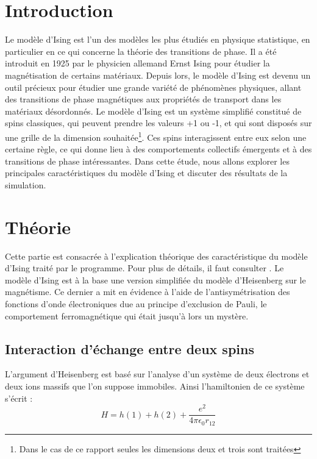 \documentclass{article}
\begin{document}
\newpage


\section{Introduction}

Le modèle d'Ising est l'un des modèles les plus étudiés en physique statistique, en particulier en ce qui concerne la théorie des transitions de phase. Il a été introduit en 1925 par le physicien allemand Ernst Ising pour étudier la magnétisation de certains matériaux. Depuis lors, le modèle d'Ising est devenu un outil précieux pour étudier une grande variété de phénomènes physiques, allant des transitions de phase magnétiques aux propriétés de transport dans les matériaux désordonnés. Le modèle d'Ising est un système simplifié constitué de spins classiques, qui peuvent prendre les valeurs +1 ou -1, et qui sont disposés sur une grille de la dimension souhaitée\footnote{Dans le cas de ce rapport seules les dimensions deux et trois sont traitées}. Ces spins interagissent entre eux selon une certaine règle, ce qui donne lieu à des comportements collectifs émergents et à des transitions de phase intéressantes. Dans cette étude, nous allons explorer les principales caractéristiques du modèle d'Ising et discuter des résultats de la simulation. 

\section{Théorie}

Cette partie est consacrée à l'explication théorique des caractéristique du modèle d'Ising traité par le programme. Pour plus de détails, il faut consulter \cite{Phystat}. Le modèle d'Ising est à la base une version simplifiée du modèle d'Heisenberg sur le magnétisme. Ce dernier a mit en évidence à l'aide de l'antisymétrisation des fonctions d'onde électroniques due au principe d'exclusion de Pauli, le comportement ferromagnétique qui était jusqu'à lors un mystère. 


\subsection{Interaction d'échange entre deux spins}

L'argument d'Heisenberg est basé sur l'analyse d'un système de deux électrons et deux ions massifs que l'on suppose immobiles. Ainsi l'hamiltonien de ce système s'écrit : 
\begin{equation}
    H= h(1) + h(2) + \frac{e^2}{4\pi\epsilon_{0}r_{12}}
\end{equation}
\end{document}
